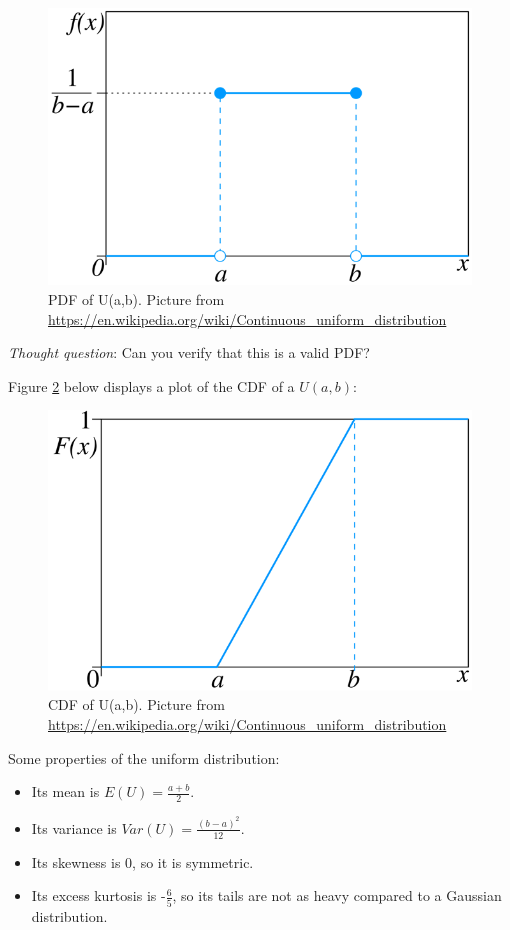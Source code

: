 \documentclass[
]{book}
\providecommand{\tightlist}{%
  \setlength{\itemsep}{0pt}\setlength{\parskip}{0pt}}
\begin{document}
\begin{figure}
\centering
\includegraphics{images/04-U.png}
\caption{\label{fig:4-U}PDF of U(a,b). Picture from \url{https://en.wikipedia.org/wiki/Continuous_uniform_distribution}}
\end{figure}

\emph{Thought question}: Can you verify that this is a valid PDF?

Figure \ref{fig:4-Ucdf} below displays a plot of the CDF of a \(U(a,b)\):

\begin{figure}
\centering
\includegraphics{images/04-Ucdf.png}
\caption{\label{fig:4-Ucdf}CDF of U(a,b). Picture from \url{https://en.wikipedia.org/wiki/Continuous_uniform_distribution}}
\end{figure}

Some properties of the uniform distribution:

\begin{itemize}
\tightlist
\item
  Its mean is \(E(U) = \frac{a+b}{2}\).
\item
  Its variance is \(Var(U) = \frac{(b-a)^2}{12}\).
\item
  Its skewness is 0, so it is symmetric.
\item
  Its excess kurtosis is -\(\frac{6}{5}\), so its tails are not as heavy compared to a Gaussian distribution.
\end{itemize}
\end{document}
